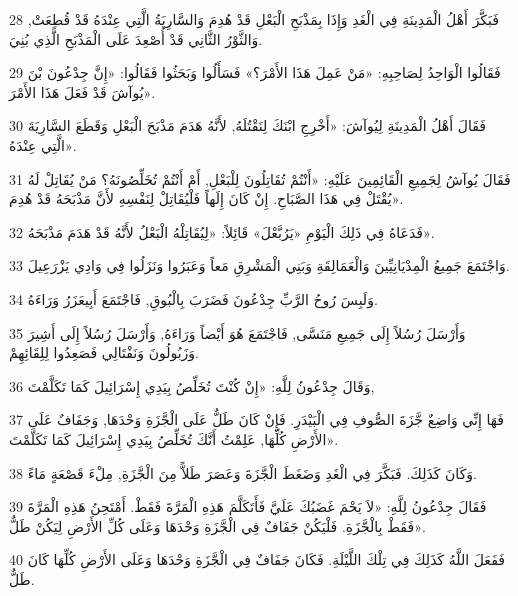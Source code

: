 \par 28 فَبَكَّرَ أَهْلُ الْمَدِينَةِ فِي الْغَدِ وَإِذَا بِمَذْبَحِ الْبَعْلِ قَدْ هُدِمَ وَالسَّارِيَةُ الَّتِي عِنْدَهُ قَدْ قُطِعَتْ, وَالثَّوْرُ الثَّانِي قَدْ أُصْعِدَ عَلَى الْمَذْبَحِ الَّذِي بُنِيَ.
\par 29 فَقَالُوا الْوَاحِدُ لِصَاحِبِهِ: «مَنْ عَمِلَ هَذَا الأَمْرَ؟» فَسَأَلُوا وَبَحَثُوا فَقَالُوا: «إِنَّ جِدْعُونَ بْنَ يُوآشَ قَدْ فَعَلَ هَذَا الأَمْرَ».
\par 30 فَقَالَ أَهْلُ الْمَدِينَةِ لِيُوآشَ: «أَخْرِجِ ابْنَكَ لِنَقْتُلَهُ, لأَنَّهُ هَدَمَ مَذْبَحَ الْبَعْلِ وَقَطَعَ السَّارِيَةَ الَّتِي عِنْدَهُ».
\par 31 فَقَالَ يُوآشُ لِجَمِيعِ الْقَائِمِينَ عَلَيْهِ: «أَنْتُمْ تُقَاتِلُونَ لِلْبَعْلِ, أَمْ أَنْتُمْ تُخَلِّصُونَهُ؟ مَنْ يُقَاتِلْ لَهُ يُقْتَلْ فِي هَذَا الصَّبَاحِ. إِنْ كَانَ إِلَهاً فَلْيُقَاتِلْ لِنَفْسِهِ لأَنَّ مَذْبَحَهُ قَدْ هُدِمَ».
\par 32 فَدَعَاهُ فِي ذَلِكَ الْيَوْمِ «يَرُبَّعْلَ» قَائِلاً: «لِيُقَاتِلْهُ الْبَعْلُ لأَنَّهُ قَدْ هَدَمَ مَذْبَحَهُ».
\par 33 وَاجْتَمَعَ جَمِيعُ الْمِدْيَانِيِّينَ وَالْعَمَالِقَةِ وَبَنِي الْمَشْرِقِ مَعاً وَعَبَرُوا وَنَزَلُوا فِي وَادِي يَزْرَعِيلَ.
\par 34 وَلَبِسَ رُوحُ الرَّبِّ جِدْعُونَ فَضَرَبَ بِالْبُوقِ, فَاجْتَمَعَ أَبِيعَزَرُ وَرَاءَهُ.
\par 35 وَأَرْسَلَ رُسُلاً إِلَى جَمِيعِ مَنَسَّى, فَاجْتَمَعَ هُوَ أَيْضاً وَرَاءَهُ, وَأَرْسَلَ رُسُلاً إِلَى أَشِيرَ وَزَبُولُونَ وَنَفْتَالِي فَصَعِدُوا لِلِقَائِهِمْ.
\par 36 وَقَالَ جِدْعُونُ لِلَّهِ: «إِنْ كُنْتَ تُخَلِّصُ بِيَدِي إِسْرَائِيلَ كَمَا تَكَلَّمْتَ,
\par 37 فَهَا إِنِّي وَاضِعٌ جَّزَةَ الصُّوفِ فِي الْبَيْدَرِ. فَإِنْ كَانَ طَلٌّ عَلَى الْجَّزَةِ وَحْدَهَا, وَجَفَافٌ عَلَى الأَرْضِ كُلِّهَا, عَلِمْتُ أَنَّكَ تُخَلِّصُ بِيَدِي إِسْرَائِيلَ كَمَا تَكَلَّمْتَ».
\par 38 وَكَانَ كَذَلِكَ. فَبَكَّرَ فِي الْغَدِ وَضَغَطَ الْجَّزَةَ وَعَصَرَ طَلاًّ مِنَ الْجَّزَةِ, مِلْءَ قَصْعَةٍ مَاءً.
\par 39 فَقَالَ جِدْعُونُ لِلَّهِ: «لاَ يَحْمَ غَضَبُكَ عَلَيَّ فَأَتَكَلَّمَ هَذِهِ الْمَرَّةَ فَقَطْ. أَمْتَحِنُ هَذِهِ الْمَرَّةَ فَقَطْ بِالْجَّزَةِ. فَلْيَكُنْ جَفَافٌ فِي الْجَّزَةِ وَحْدَهَا وَعَلَى كُلِّ الأَرْضِ لِيَكُنْ طَلٌّ».
\par 40 فَفَعَلَ اللَّهُ كَذَلِكَ فِي تِلْكَ اللَّيْلَةِ. فَكَانَ جَفَافٌ فِي الْجَّزَةِ وَحْدَهَا وَعَلَى الأَرْضِ كُلِّهَا كَانَ طَلٌّ.

